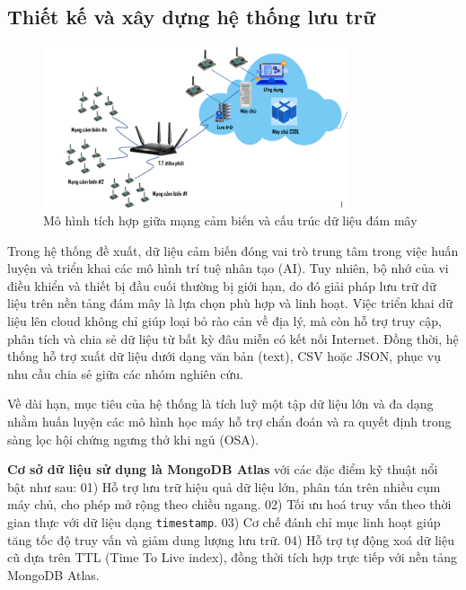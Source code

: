 \subsection{Thiết kế và xây dựng hệ thống lưu trữ}
\begin{figure}[htbp]
    \centering
    \includegraphics[width=0.8\textwidth]{images/cloud.png}
    \caption{Mô hình tích hợp giữa mạng cảm biến và cấu trúc dữ liệu đám mây}
    \label{cloud}
\end{figure}

Trong hệ thống đề xuất, dữ liệu cảm biến đóng vai trò trung tâm trong việc 
huấn luyện và triển khai các mô hình trí tuệ nhân tạo (AI). Tuy nhiên, bộ nhớ 
của vi điều khiển và thiết bị đầu cuối thường bị giới hạn, do đó giải pháp lưu 
trữ dữ liệu trên nền tảng đám mây là lựa chọn phù hợp và linh hoạt. Việc triển 
khai dữ liệu lên cloud không chỉ giúp loại bỏ rào cản về địa lý, mà còn hỗ 
trợ truy cập, phân tích và chia sẻ dữ liệu từ bất kỳ đâu miễn có kết nối 
Internet. Đồng thời, hệ thống hỗ trợ xuất dữ liệu dưới dạng văn bản (text), 
CSV hoặc JSON, phục vụ nhu cầu chia sẻ giữa các nhóm nghiên cứu.

Về dài hạn, mục tiêu của hệ thống là tích luỹ một tập dữ liệu lớn và đa dạng 
nhằm huấn luyện các mô hình học máy hỗ trợ chẩn đoán và ra quyết định trong 
sàng lọc hội chứng ngưng thở khi ngủ (\gls{OSA}).



\textbf{Cơ sở dữ liệu sử dụng là MongoDB Atlas} với các đặc điểm kỹ thuật nổi bật như sau:
01) Hỗ trợ lưu trữ hiệu quả dữ liệu lớn, phân tán trên nhiều cụm máy chủ, 
cho phép mở rộng theo chiều ngang.
02) Tối ưu hoá truy vấn theo thời gian thực với dữ liệu dạng \texttt{timestamp}.
03) Cơ chế đánh chỉ mục linh hoạt giúp tăng tốc độ truy vấn và giảm dung lượng lưu trữ.
04) Hỗ trợ tự động xoá dữ liệu cũ dựa trên TTL (Time To Live index), 
đồng thời tích hợp trực tiếp với nền tảng MongoDB Atlas.

